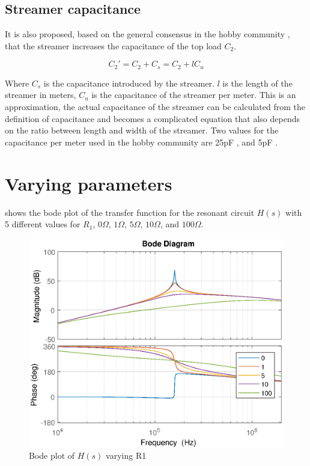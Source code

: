 \subsection{Streamer capacitance}
It is also proposed, based on the general consensus in the hobby community \citep{streamercapacitance}, that the streamer increases the capacitance of the top load $C_2$.

\begin{equation}
    C_2' = C_2 + C_s = C_2 + l C_u
\end{equation}

Where $C_s$ is the capacitance introduced by the streamer. $l$ is the length of the streamer in meters, $C_u$ is the capacitance of the streamer per meter. This is an approximation, the actual capacitance of the streamer can be calculated from the definition of capacitance and becomes a complicated equation that also depends on the ratio between length and width of the streamer. Two values for the capacitance per meter used in the hobby community are 25pF \citep{conner}, and 5pF \citep{scantesla}.

\newpage
\section{Varying parameters}

 shows the bode plot of the transfer function for the resonant circuit $H(s)$ with 5 different values for $R_1$, $0\Omega$, $1\Omega$, $5\Omega$, $10\Omega$, and $100\Omega$.

\begin{figure}[H]
    \centering
    \includegraphics[width=\textwidth]{img/CoilRigBode_R1.eps}
    \caption{Bode plot of $H(s)$ varying R1}
    \label{fig:bode_r1}
\end{figure}

